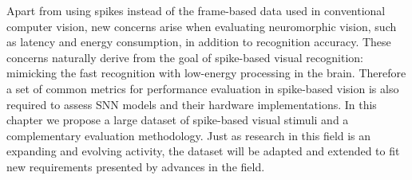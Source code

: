 Apart from using spikes instead of the frame-based data used in conventional computer vision, new concerns arise when evaluating neuromorphic vision, such as latency and energy consumption, in addition to recognition accuracy.
These concerns naturally derive from the goal of spike-based visual recognition: mimicking the fast recognition with low-energy processing in the brain. 
Therefore a set of common metrics for performance evaluation in spike-based vision is also required to assess SNN models and their hardware implementations.
In this chapter we propose a large dataset of spike-based visual stimuli and a complementary evaluation methodology.
Just as research in this field is an expanding and evolving activity, the dataset will be adapted and extended to fit new requirements presented by advances in the field.



